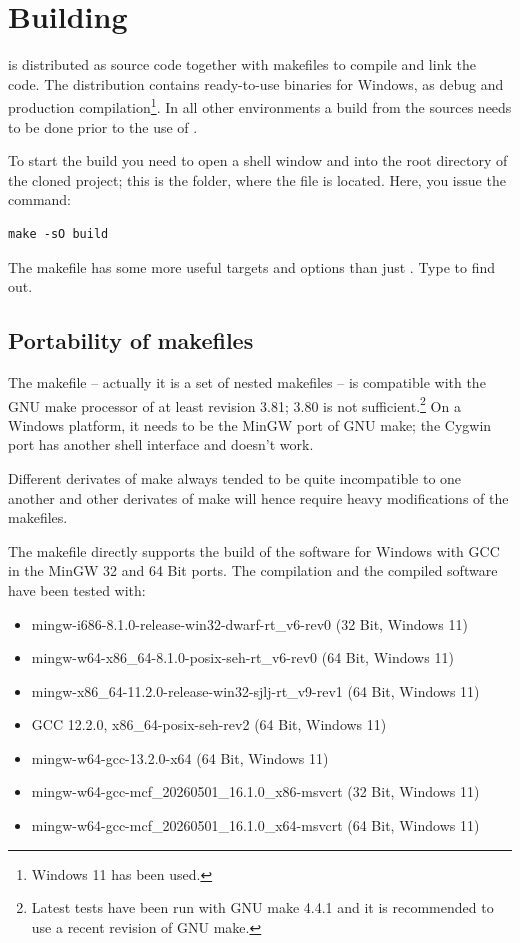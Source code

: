\chapter{Building \linnet{}}
\label{secBuildingLinNet}

\linnet{} is distributed as source code together with makefiles to compile
and link the code. The distribution contains ready-to-use binaries for
Windows, as debug and production compilation\footnote{Windows 11 has been
used.}. In all other environments a build from the sources needs to be
done prior to the use of \linnet{}.

To start the build you need to open a shell window and  into the
root directory of the cloned project; this is the folder, where the file
 is located. Here, you issue the command:
\begin{verbatim}
make -sO build
\end{verbatim}
The makefile has some more useful targets and options than just
. Type  to find out.


\section{Portability of makefiles}

The makefile -- actually it is a set of nested makefiles -- is compatible
with the GNU make processor of at least revision 3.81; 3.80 is not
sufficient.\footnote{Latest tests have been run with GNU make 4.4.1 and it
is recommended to use a recent revision of GNU make.} On a Windows
platform, it needs to be the MinGW port of GNU make; the Cygwin port has
another shell interface and doesn't work.

Different derivates of make always tended to be quite incompatible to one
another and other derivates of make will hence require heavy modifications
of the makefiles.

The makefile directly supports the build of the software for Windows with
GCC in the MinGW 32 and 64 Bit ports. The compilation and the compiled
software have been tested with:

\begin{itemize}
  \item mingw-i686-8.1.0-release-win32-dwarf-rt\_v6-rev0 (32 Bit, Windows 11)
  \item mingw-w64-x86\_64-8.1.0-posix-seh-rt\_v6-rev0 (64 Bit, Windows 11)
  \item mingw-x86\_64-11.2.0-release-win32-sjlj-rt\_v9-rev1 (64 Bit, Windows 11)
  \item GCC 12.2.0, x86\_64-posix-seh-rev2 (64 Bit, Windows 11)
  \item mingw-w64-gcc-13.2.0-x64 (64 Bit, Windows 11)
  \item mingw-w64-gcc-mcf\_20260501\_16.1.0\_x86-msvcrt (32 Bit, Windows 11)
  \item mingw-w64-gcc-mcf\_20260501\_16.1.0\_x64-msvcrt (64 Bit, Windows 11)
\end{itemize}

